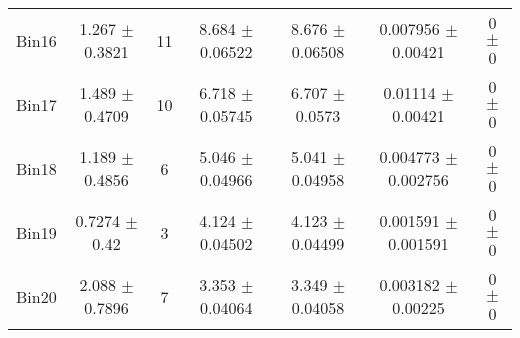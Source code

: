 \begin{tabular}{@{\extracolsep{4pt}}lcccccc@{}}
     Bin16 & 1.267 $\pm$ 0.3821 & 11 & 8.684 $\pm$ 0.06522 & 8.676 $\pm$ 0.06508 & 0.007956 $\pm$ 0.00421 & 0 $\pm$ 0 \\ 
     Bin17 & 1.489 $\pm$ 0.4709 & 10 & 6.718 $\pm$ 0.05745 & 6.707 $\pm$ 0.0573 & 0.01114 $\pm$ 0.00421 & 0 $\pm$ 0 \\ 
     Bin18 & 1.189 $\pm$ 0.4856 & 6 & 5.046 $\pm$ 0.04966 & 5.041 $\pm$ 0.04958 & 0.004773 $\pm$ 0.002756 & 0 $\pm$ 0 \\ 
     Bin19 & 0.7274 $\pm$ 0.42 & 3 & 4.124 $\pm$ 0.04502 & 4.123 $\pm$ 0.04499 & 0.001591 $\pm$ 0.001591 & 0 $\pm$ 0 \\ 
     Bin20 & 2.088 $\pm$ 0.7896 & 7 & 3.353 $\pm$ 0.04064 & 3.349 $\pm$ 0.04058 & 0.003182 $\pm$ 0.00225 & 0 $\pm$ 0 \\ 
\hline\hline
  \end{tabular}
